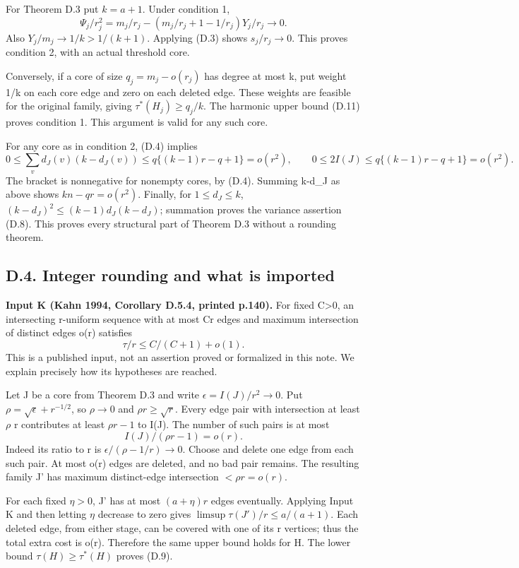 \documentclass[
  11pt,
]{article}
\begin{document}
For Theorem D.3 put \(k=a+1\). Under condition 1, \[
 \Psi_j/r_j^2
 =m_j/r_j-(m_j/r_j+1-1/r_j)Y_j/r_j\longrightarrow0.
\] Also \(Y_j/m_j\to1/k>1/(k+1)\). Applying (D.3) shows \(s_j/r_j\to0\).
This proves condition 2, with an actual threshold core.

Conversely, if a core of size \(q_j=m_j-o(r_j)\) has degree at most k,
put weight 1/k on each core edge and zero on each deleted edge. These
weights are feasible for the original family, giving
\(\tau^*(H_j)\ge q_j/k\). The harmonic upper bound (D.11) proves
condition 1. This argument is valid for any such core.

For any core as in condition 2, (D.4) implies \[
 0\le\sum_v d_J(v)(k-d_J(v))\le q\{(k-1)r-q+1\}=o(r^2),
 \qquad 0\le2I(J)\le q\{(k-1)r-q+1\}=o(r^2).
\] The bracket is nonnegative for nonempty cores, by (D.4). Summing
k-d\_J as above shows \(kn-qr=o(r^2)\). Finally, for \(1\le d_J\le k\),
\((k-d_J)^2\le(k-1)d_J(k-d_J)\); summation proves the variance assertion
(D.8). This proves every structural part of Theorem D.3 without a
rounding theorem.

\subsection{D.4. Integer rounding and what is
imported}\label{d.4.-integer-rounding-and-what-is-imported}

\textbf{Input K (Kahn 1994, Corollary D.5.4, printed p.140).} For fixed
C\textgreater0, an intersecting r-uniform sequence with at most Cr edges
and maximum intersection of distinct edges o(r) satisfies \[
                    \tau/r\le C/(C+1)+o(1).                \tag{D.13}
\] This is a published input, not an assertion proved or formalized in
this note. We explain precisely how its hypotheses are reached.

Let J be a core from Theorem D.3 and write \(\epsilon=I(J)/r^2\to0\).
Put \(\rho=\sqrt{\epsilon}+r^{-1/2}\), so \(\rho\to0\) and
\(\rho r\ge\sqrt r\). Every edge pair with intersection at least
\(\rho\) r contributes at least \(\rho r-1\) to I(J). The number of such
pairs is at most \[
 I(J)/(\rho r-1)=o(r).
\] Indeed its ratio to r is \(\epsilon/(\rho-1/r)\to0\). Choose and
delete one edge from each such pair. At most o(r) edges are deleted, and
no bad pair remains. The resulting family J' has maximum distinct-edge
intersection \(<\rho r=o(r)\).

For each fixed \(\eta>0\), J' has at most \((a+\eta)r\) edges
eventually. Applying Input K and then letting \(\eta\) decrease to zero
gives \(\limsup\tau(J')/r\le a/(a+1)\). Each deleted edge, from either
stage, can be covered with one of its r vertices; thus the total extra
cost is o(r). Therefore the same upper bound holds for H. The lower
bound \(\tau(H)\ge\tau^*(H)\) proves (D.9).
\end{document}
